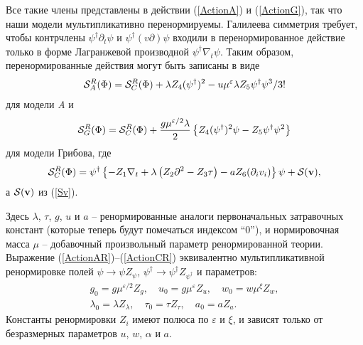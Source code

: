 \documentclass[a4paper,10pt]{article}
\def\S{{\cal S}}
\def\bfv{{\bf v}}
\def\S{{\cal S}}
\def\bfv{{\bf v}}
\begin{document}
Все такие члены представлены в действии (\ref{ActionA}) и (\ref{ActionG}), так что наши модели мультипликативно перенормируемы.
Галилеева симметрия требует, чтобы контрчлены 
$\psi^{\dag}\partial_{t}\psi$ и $\psi^{\dag} (v\partial) \psi $ входили в перенормированное действие только в форме Лагранжевой производной 
 $\psi^{\dag}\nabla_{t}\psi$. 
Таким образом, перенормированные действия могут быть записаны в виде
\begin{eqnarray}
\S_{A}^{R}(\Phi) = \S_{C}^{R}(\Phi) +
\lambda Z_{4}  (\psi^{\dag})^{2} -
u\mu^{\varepsilon} \lambda Z_{5}  \psi^{\dag} \psi^{3} /3!
\label{ActionAR}
\end{eqnarray}
для модели {\it A} и
\begin{eqnarray}
\S_{G}^{R}(\Phi) = \S_{C}^{R}(\Phi)
+ \frac{g\mu^{\varepsilon/2}\lambda}{2} \left\{ Z_{4}(\psi^{\dagger})^2\psi
- Z_{5} \psi^{\dagger}\psi^2  \right\}
\label{ActionGR}
\end{eqnarray}
для модели Грибова, где
\begin{eqnarray}
\S_{C}^{R}(\Phi) =  \psi^{\dag} \left\{
- Z_{1} \nabla_{t} + \lambda\left( Z_{2} \partial^{2}- Z_{3}\tau\right)
- a Z_{6} (\partial_{i}v_{i}) \right\} \psi +  \S(\bfv),
\label{ActionCR}
\end{eqnarray}
а $\S(\bfv)$ из (\ref{Sv}).

Здесь $\lambda$, $\tau$, $g$, $u$ и $a$ -- ренормированные аналоги
первоначальных затравочных констант  (которые теперь будут помечаться
индексом ``0''), и нормировочная масса $\mu $ -- добавочный произвольный
параметр ренормированной теории. Выражение (\ref{ActionAR})--(\ref{ActionCR})
эквивалентно мультипликативной ренормировке полей $\psi \to \psi Z_{\psi}$,
$\psi^{\dag} \to \psi^{\dag} Z_{\psi^{\dag}}$
и параметров:
\begin{eqnarray}
g_{0} = g \mu^{\varepsilon/2} Z_{g}, \quad u_{0} = g \mu^{\varepsilon} Z_{u}, \quad
w_{0} = w \mu^{\xi} Z_{w}, \nonumber \\
\lambda_{0} = \lambda Z_{\lambda}, \quad
\tau_{0} = \tau Z_{\tau},  \quad  a_{0} = a Z_{a}.
\label{Multy}
\end{eqnarray}
 Константы ренормировки $Z_{i}$ имеют полюса по  $\varepsilon$ и $\xi$, и зависят только от безразмерных параметров
 $u$, $w$, $\alpha$ и $a$.
\end{document}
